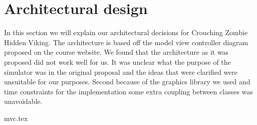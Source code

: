 \chapter{Architectural design}
In this section we will explain our architectural decisions for Crouching Zombie Hidden Viking. The architecture is based off the model view controller diagram proposed on the course website. We found that the architecture as it was proposed did not work well for us. It was unclear what the purpose of the simulator was in the original proposal and the ideas that were clarified were unsuitable for our purposes. Second because of the graphics library we used and time constraints for the implementation some extra coupling between classes was unavoidable.

{mvc.tex}